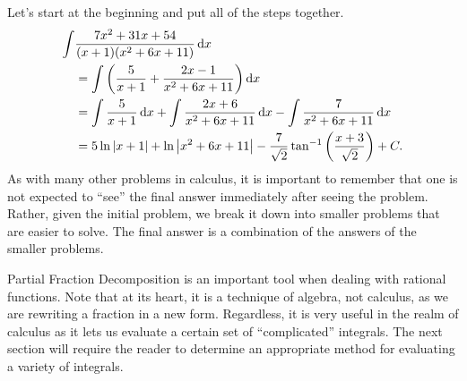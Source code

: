 \begin{example}
Let's start at the beginning and put all of the steps together.
\begin{align*}
	\int&\frac{7x^2+31x+54}{(x+1)(x^2+6x+11)}\operatorname{d}\! x \\
	&= \int\left(\frac{5}{x+1} + \frac{2x-1}{x^2+6x+11}\right)\operatorname{d}\! x \\
	&= \int\frac{5}{x+1}\operatorname{d}\! x  + \int\frac{2x+6}{x^2+6x+11}\operatorname{d}\! x -\int\frac{7}{x^2+6x+11}\operatorname{d}\! x \\
	&= 5\ln\left\lvert x+1 \right\rvert+\ln\left\lvert x^2+6x+11 \right\rvert-\frac7{\sqrt2}\tan^{-1}\left(\frac{x+3}{\sqrt2}\right)+C.
\end{align*}
As with many other problems in calculus, it is important to remember that one is not expected to ``see'' the final answer immediately after seeing the problem. Rather, given the initial problem, we break it down into smaller problems that are easier to solve. The final answer is a combination of the answers of the smaller problems.
\end{example}

Partial Fraction Decomposition is an important tool when dealing with rational functions. Note that at its heart, it is a technique of algebra, not calculus, as we are rewriting a fraction in a new form. Regardless, it is very useful in the realm of calculus as it lets us evaluate a certain set of ``complicated'' integrals.  The next section will require the reader to determine an appropriate method for evaluating a variety of integrals.

